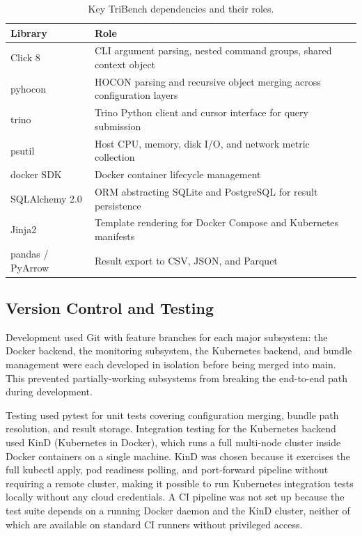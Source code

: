 \documentclass{l4proj}
\begin{document}
\begin{table}[H]
\centering
\begin{tabular}{lp{9cm}}
\hline
\textbf{Library} & \textbf{Role} \\
\hline
Click 8          & CLI argument parsing, nested command groups, shared context object \\
pyhocon          & HOCON parsing and recursive object merging across configuration layers \\
trino            & Trino Python client and cursor interface for query submission \\
psutil           & Host CPU, memory, disk I/O, and network metric collection \\
docker SDK       & Docker container lifecycle management \\
SQLAlchemy 2.0   & ORM abstracting SQLite and PostgreSQL for result persistence \\
Jinja2           & Template rendering for Docker Compose and Kubernetes manifests \\
pandas / PyArrow & Result export to CSV, JSON, and Parquet \\
\hline
\end{tabular}
\caption{Key TriBench dependencies and their roles.}
\label{tab:dependencies}
\end{table}

\subsection{Version Control and Testing}
\label{sec:impl_vcs}

Development used Git with feature branches for each major subsystem: the Docker backend, the monitoring subsystem, the Kubernetes backend, and bundle management were each developed in isolation before being merged into main. This prevented partially-working subsystems from breaking the end-to-end path during development.

Testing used pytest for unit tests covering configuration merging, bundle path resolution, and result storage. Integration testing for the Kubernetes backend used KinD (Kubernetes in Docker), which runs a full multi-node cluster inside Docker containers on a single machine. KinD was chosen because it exercises the full kubectl apply, pod readiness polling, and port-forward pipeline without requiring a remote cluster, making it possible to run Kubernetes integration tests locally without any cloud credentials. A CI pipeline was not set up because the test suite depends on a running Docker daemon and the KinD cluster, neither of which are available on standard CI runners without privileged access.
\end{document}
